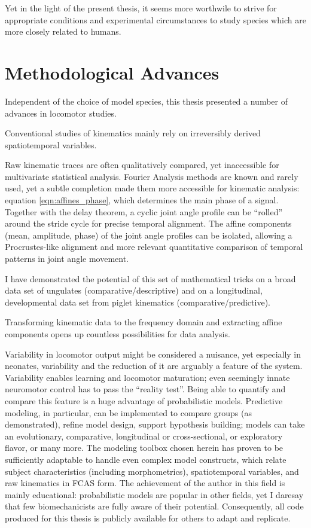 Yet in the light of the present thesis, it seems more worthwile to strive for appropriate conditions and experimental circumstances to study species which are more closely related to humans.


\section{Methodological Advances}
\label{sec:org3fd0a6d}
Independent of the choice of model species, this thesis presented a number of advances in locomotor studies.


Conventional studies of kinematics mainly rely on irreversibly derived spatiotemporal variables.

Raw kinematic traces are often qualitatively compared, yet inaccessible for multivariate statistical analysis.
Fourier Analysis methods are known and rarely used, yet a subtle completion made them more accessible for kinematic analysis: equation \eqref{eqn:affines_phase}, which determines the main phase of a signal.
Together with the delay theorem, a cyclic joint angle profile can be ``rolled'' around the stride cycle for precise temporal alignment.
The affine components (mean, amplitude, phase) of the joint angle profiles can be isolated, allowing a Procrustes-like alignment and more relevant quantitative comparison of temporal patterns in joint angle movement.

I have demonstrated the potential of this set of mathematical tricks on a broad data set of ungulates (comparative/descriptive) and on a longitudinal, developmental data set from piglet kinematics (comparative/predictive).


Transforming kinematic data to the frequency domain and extracting affine components opens up countless possibilities for data analysis.

Variability in locomotor output might be considered a nuisance, yet especially in neonates, variability and the reduction of it are arguably a feature of the system.
Variability enables learning and locomotor maturation; even seemingly innate neuromotor control has to pass the ``reality test''.
Being able to quantify and compare this feature is a huge advantage of probabilistic models.
Predictive modeling, in particular, can be implemented to compare groups (as demonstrated), refine model design, support hypothesis building; models can take an evolutionary, comparative, longitudinal or cross-sectional, or exploratory flavor, or many more.
The modeling toolbox chosen herein has proven to be sufficiently adaptable to handle even complex model constructs, which relate subject characteristics (including morphometrics), spatiotemporal variables, and raw kinematics in FCAS form.
The achievement of the author in this field is mainly educational: probabilistic models are popular in other fields, yet I daresay that few biomechanicists are fully aware of their potential.
Consequently, all code produced for this thesis is publicly available for others to adapt and replicate.

